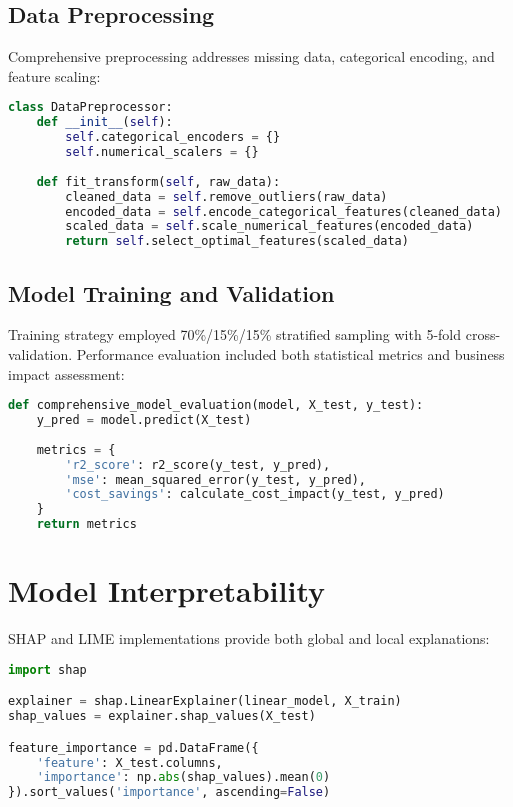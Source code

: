 \documentclass[12pt,a4paper]{report}
\begin{document}
\subsection{Data Preprocessing}

Comprehensive preprocessing addresses missing data, categorical encoding, and feature scaling:

\begin{lstlisting}[language=Python, caption=Data Preprocessing Pipeline]
class DataPreprocessor:
    def __init__(self):
        self.categorical_encoders = {}
        self.numerical_scalers = {}
    
    def fit_transform(self, raw_data):
        cleaned_data = self.remove_outliers(raw_data)
        encoded_data = self.encode_categorical_features(cleaned_data)
        scaled_data = self.scale_numerical_features(encoded_data)
        return self.select_optimal_features(scaled_data)
\end{lstlisting}

\subsection{Model Training and Validation}

Training strategy employed 70\%/15\%/15\% stratified sampling with 5-fold cross-validation. Performance evaluation included both statistical metrics and business impact assessment:

\begin{lstlisting}[language=Python, caption=Model Evaluation]
def comprehensive_model_evaluation(model, X_test, y_test):
    y_pred = model.predict(X_test)
    
    metrics = {
        'r2_score': r2_score(y_test, y_pred),
        'mse': mean_squared_error(y_test, y_pred),
        'cost_savings': calculate_cost_impact(y_test, y_pred)
    }
    return metrics
\end{lstlisting}

\section{Model Interpretability}

SHAP and LIME implementations provide both global and local explanations:

\begin{lstlisting}[language=Python, caption=Model Interpretability]
import shap

explainer = shap.LinearExplainer(linear_model, X_train)
shap_values = explainer.shap_values(X_test)

feature_importance = pd.DataFrame({
    'feature': X_test.columns,
    'importance': np.abs(shap_values).mean(0)
}).sort_values('importance', ascending=False)
\end{lstlisting}
\end{document}
